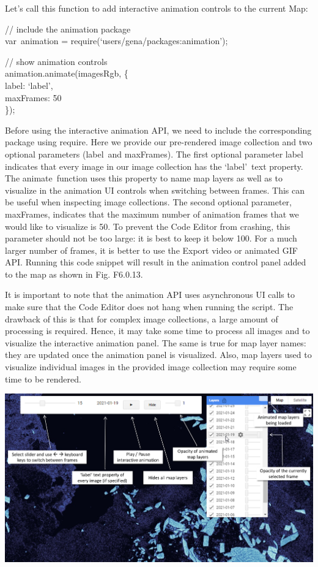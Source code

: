 \documentclass[
  letterpaper,
  DIV=11,
  numbers=noendperiod]{scrreprt}
\begin{document}
Let's call this function to add interactive animation controls to the
current Map:

// include the animation package\\
var~animation = require(`users/gena/packages:animation');

// show animation controls\\
animation.animate(imagesRgb, \{\\
\hspace*{0.333em}label: `label',\\
\hspace*{0.333em}maxFrames: 50\\
\});

Before using the interactive animation API, we need to include the
corresponding package using require. Here we provide our pre-rendered
image collection and two optional parameters (label~and maxFrames). The
first optional parameter label indicates that every image in our image
collection has the `label'~text property. The animate~function uses this
property to name map layers as well as to visualize in the animation UI
controls when switching between frames. This can be useful when
inspecting image collections. The second optional parameter, maxFrames,
indicates that the maximum number of animation frames that we would like
to visualize is 50. To prevent the Code Editor from crashing, this
parameter should not be too large: it is best to keep it below 100. For
a much larger number of frames, it is better to use the Export video or
animated GIF API. Running this code snippet will result in the animation
control panel added to the map as shown in Fig. F6.0.13.

It is important to note that the animation API uses asynchronous UI
calls to make sure that the Code Editor does not hang when running the
script. The drawback of this is that for complex image collections, a
large amount of processing is required. Hence, it may take some time to
process all images and to visualize the interactive animation panel. The
same is true for map layer names: they are updated once the animation
panel is visualized. Also, map layers used to visualize individual
images in the provided image collection may require some time to be
rendered.

\includegraphics{./F6/image70.png}
\end{document}
